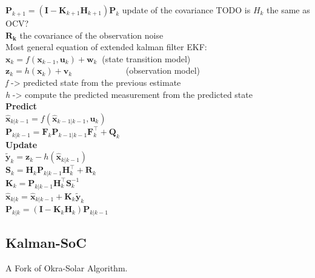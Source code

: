 $ \mathbf {P} _{k+1}=\left(\mathbf {I} -\mathbf {K} _{k+1}\mathbf {H} _{k+1}\right)\mathbf {P} _{k} $ update of the covariance TODO is $H_{k}$ the same as OCV? \\

$\mathbf{R_k}$ the covariance of the observation noise  \\

Most general equation of extended kalman filter EKF: \\

$ \mathbf {x}_{k}=f(\mathbf {x} _{k-1},\mathbf {u}_{k})+\mathbf {w}_{k}\ $ (state transition model) \\
$\mathbf {z}_{k}=h(\mathbf {x} _{k})+\mathbf {v}_{k}$ \ \ \ \ \ \ \ \ \ \ \  \ (observation model)  \\
\emph{f} ->  predicted state from the previous estimate  \\
\emph{h} ->  compute the predicted measurement from the predicted state \\


\textbf{Predict} \\
${\displaystyle {\hat {\boldsymbol {x}}}_{k|k-1}=f({\hat {\boldsymbol {x}}}_{k-1|k-1},{\boldsymbol {u}}_{k})} $ \\
${\displaystyle {\boldsymbol {P}}_{k|k-1}={{\boldsymbol {F}}_{k}}{\boldsymbol {P}}_{k-1|k-1}{{\boldsymbol {F}}_{k}^{\top }}+{\boldsymbol {Q}}_{k}}$ \\

\textbf{Update} \\
${\tilde  {{\boldsymbol  {y}}}}_{{k}}={\boldsymbol  {z}}_{{k}}-h({\hat  {{\boldsymbol  {x}}}}_{{k|k-1}})$ \\
${\boldsymbol  {S}}_{{k}}={{{\boldsymbol  {H}}_{{k}}}}{\boldsymbol  {P}}_{{k|k-1}}{{{\boldsymbol  {H}}_{{k}}^{\top }}}+{\boldsymbol  {R}}_{{k}}$ \\
${\boldsymbol  {K}}_{{k}}={\boldsymbol  {P}}_{{k|k-1}}{{{\boldsymbol  {H}}_{{k}}^{\top }}}{\boldsymbol  {S}}_{{k}}^{{-1}}$ \\
${\hat  {{\boldsymbol  {x}}}}_{{k|k}}={\hat  {{\boldsymbol  {x}}}}_{{k|k-1}}+{\boldsymbol  {K}}_{{k}}{\tilde  {{\boldsymbol  {y}}}}_{{k}}$ \\
${\boldsymbol  {P}}_{{k|k}}=({\boldsymbol  {I}}-{\boldsymbol  {K}}_{{k}}{{{\boldsymbol  {H}}_{{k}}}}){\boldsymbol  {P}}_{{k|k-1}}$ \\




\subsection{Kalman-SoC}
A Fork of Okra-Solar Algorithm. \

